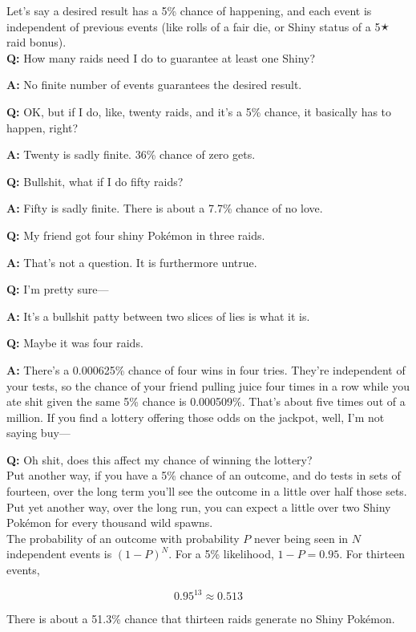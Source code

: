 \begin{tcolorbox}[enhanced,title=An aside regarding independent events,halign title=flush center]
Let's say a desired result has a 5\% chance of happening, and each event is independent of previous events (like rolls of a fair die, or Shiny status of a 5🟉 raid bonus).\\

\textbf{Q:} How many raids need I do to guarantee at least one Shiny?

\textbf{A:} No finite number of events guarantees the desired result.

\textbf{Q:} OK, but if I do, like, twenty raids, and it's a 5\% chance, it basically has to happen, right?

\textbf{A:} Twenty is sadly finite. 36\% chance of zero gets.

\textbf{Q:} Bullshit, what if I do fifty raids?

\textbf{A:} Fifty is sadly finite. There is about a 7.7\% chance of no love.

\textbf{Q:} My friend got four shiny Pokémon in three raids.

\textbf{A:} That's not a question. It is furthermore untrue.

\textbf{Q:} I'm pretty sure---

\textbf{A:} It's a bullshit patty between two slices of lies is what it is.

\textbf{Q:} Maybe it was four raids.

\textbf{A:} There's a 0.000625\% chance of four wins in four tries. They're independent of your tests,
             so the chance of your friend pulling juice four times in a row while you ate shit given
             the same 5\% chance is 0.000509\%. That's about five times out of a million.
             If you find a lottery offering those odds on the jackpot, well, I'm not saying buy---

\textbf{Q:} Oh shit, does this affect my chance of winning the lottery?\\

Put another way, if you have a 5\% chance of an outcome, and do tests in sets of fourteen,
 over the long term you'll see the outcome in a little over half those sets.
Put yet another way, over the long run, you can expect a little over two Shiny
 Pokémon for every thousand wild spawns.\\

The probability of an outcome with probability $P$ never being seen in $N$ independent
  events is ${(1 - P)}^N$. For a 5\% likelihood, $1 - P = 0.95$. For thirteen events,

  \[ 0.95^{13} ≈ 0.513 \]

There is about a 51.3\% chance that thirteen raids generate no Shiny Pokémon.
\end{tcolorbox}
